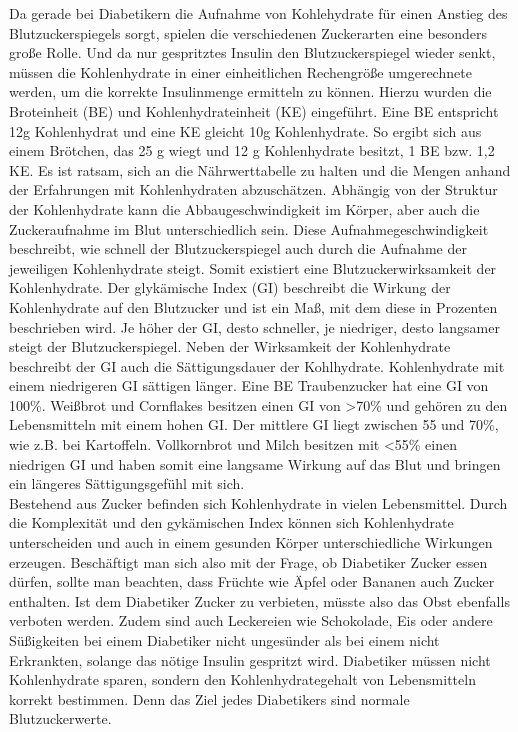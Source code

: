 		Da gerade bei Diabetikern die Aufnahme von Kohlehydrate für einen Anstieg des Blutzuckerspiegels sorgt, spielen die verschiedenen Zuckerarten eine besonders große Rolle. Und da nur gespritztes Insulin den Blutzuckerspiegel wieder senkt, müssen die Kohlenhydrate in einer einheitlichen Rechengröße umgerechnete werden, um die korrekte Insulinmenge ermitteln zu können. Hierzu wurden die Broteinheit (BE) und Kohlenhydrateinheit (KE) eingeführt. Eine BE entspricht 12g Kohlenhydrat und eine KE gleicht 10g Kohlenhydrate. So ergibt sich aus einem Brötchen, das 25 g wiegt und 12 g Kohlenhydrate besitzt, 1 BE bzw. 1,2 KE. Es ist ratsam, sich an die Nährwerttabelle zu halten und die Mengen anhand der Erfahrungen mit Kohlenhydraten abzuschätzen.\newline
		Abhängig von der Struktur der Kohlenhydrate kann die Abbaugeschwindigkeit im Körper, aber auch die Zuckeraufnahme im Blut unterschiedlich sein. Diese Aufnahmegeschwindigkeit beschreibt, wie schnell der Blutzuckerspiegel auch durch die Aufnahme der jeweiligen Kohlenhydrate steigt. Somit existiert eine \glqq Blutzuckerwirksamkeit der Kohlenhydrate\grqq{}. Der glykämische Index (GI) beschreibt die Wirkung der Kohlenhydrate auf den Blutzucker und ist ein Maß, mit dem diese in Prozenten beschrieben wird. Je höher der GI, desto schneller, je niedriger, desto langsamer steigt der Blutzuckerspiegel. Neben der Wirksamkeit der Kohlenhydrate beschreibt der GI auch die Sättigungsdauer der Kohlhydrate. Kohlenhydrate mit einem niedrigeren GI sättigen länger. \newline
		Eine BE Traubenzucker hat eine GI von 100\%. Weißbrot und Cornflakes besitzen einen GI von >70\% und gehören zu den Lebensmitteln mit einem hohen GI. Der mittlere GI liegt zwischen 55 und 70\%, wie z.B. bei Kartoffeln. Vollkornbrot und Milch besitzen mit <55\% einen niedrigen GI und haben somit eine langsame Wirkung auf das Blut und bringen ein längeres Sättigungsgefühl mit sich. \cite{SG}\\
		Bestehend aus Zucker befinden sich Kohlenhydrate in vielen Lebensmittel. Durch die Komplexität und den gykämischen Index können sich Kohlenhydrate unterscheiden und auch in einem gesunden Körper unterschiedliche Wirkungen erzeugen. Beschäftigt man sich also mit der Frage, ob Diabetiker Zucker essen dürfen, sollte man beachten, dass Früchte wie Äpfel oder Bananen auch Zucker enthalten. Ist dem Diabetiker Zucker zu verbieten, müsste also das Obst ebenfalls verboten werden. Zudem sind auch Leckereien wie Schokolade, Eis oder andere Süßigkeiten bei einem Diabetiker nicht ungesünder als bei einem nicht Erkrankten, solange das nötige Insulin gespritzt wird. Diabetiker müssen nicht Kohlenhydrate sparen, sondern den Kohlenhydrategehalt von Lebensmitteln korrekt bestimmen. Denn das Ziel jedes Diabetikers sind normale Blutzuckerwerte. \cite{SG}		
